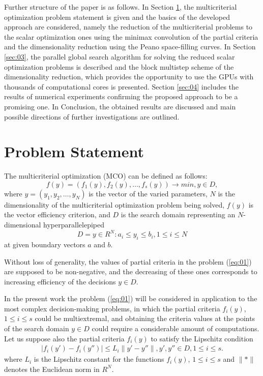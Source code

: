 \documentclass[runningheads]{llncs}
\begin{document}
Further structure of the paper is as follows. In Section \ref{sec:02}, the multicriterial optimization problem statement is given and the basics of the developed approach are considered, namely the reduction of the multicriterial problems to the scalar optimization ones using the minimax convolution of the partial criteria and the dimensionality reduction using the Peano space-filling curves. In Section \ref{sec:03}, the parallel global search algorithm for solving the reduced scalar optimization problems is described and the block multistep scheme of the dimensionality reduction, which provides the opportunity to use the GPUs with thousands of computational cores is presented. Section \ref{sec:04} includes the results of numerical experiments confirming the proposed approach to be a promising one. In Conclusion, the obtained results are discussed and main possible directions of further investigations are outlined.

\section{Problem Statement}\label{sec:02}

The multicriterial  optimization (MCO) can be defined as follows:
\begin{equation}
\label{eq:01}
f(y) = (f_1(y), f_2(y),\dots, f_s(y)) \to min,  y \in D,	
\end{equation}
where $y = (y_1, y_2,\dots, y_N)$ is the vector of the varied parameters, $N$ is the dimensionality of the multicriterial optimization problem being solved, $f(y)$ is the vector efficiency criterion, and $D$ is the search domain representing an $N$-dimensional hyperparallelepiped 
\begin{equation}
D  = { y \in R^N: a_i \leq y_i \leq b_i, 1 \leq i \leq N }
\end{equation}
at given boundary vectors $a$ and $b$. 

Without loss of generality, the values of partial criteria in the problem (\ref{eq:01}) are supposed to be non-negative, and the decreasing of these ones corresponds to increasing efficiency of the decisions $y \in D$.

In the present work the problem (\ref{eq:01}) will be considered in application to the most complex decision-making problems, in which the partial criteria $f_i(y)$, $1 \leq i \leq s$ could be multiextremal, and obtaining the criteria values at the points of the search domain $y \in D$ could require a considerable amount of computations. Let us suppose also the partial criteria $f_i(y)$ to satisfy the Lipschitz condition
\begin{eqnarray} \label{eq:02}
|f_i(y') - f_i(y'')| \leq L_i \|y' - y''\|, y', y'' \in D, 1 \leq i \leq s. 
\end{eqnarray} 
where $L_i$ is the Lipschitz constant for the functions $f_i(y)$, $1 \leq i \leq s$ and $\| * \|$ denotes the Euclidean norm in $R^N$.
\end{document}
